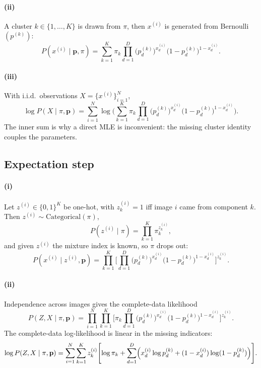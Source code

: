 \documentclass[11pt]{article}
\begin{document}
\paragraph{(ii)}
A cluster \(k\in\{1,\ldots,K\}\) is drawn from \(\pi\), then
\(x^{(i)}\) is generated from Bernoulli\((p^{(k)})\):
\begin{equation}
  P(x^{(i)}\mid \mathbf{p},\pi)
  =\sum_{k=1}^K \pi_k
  \prod_{d=1}^D
  \bigl(p_d^{(k)}\bigr)^{x_d^{(i)}}
  \bigl(1-p_d^{(k)}\bigr)^{1-x_d^{(i)}}.
\end{equation}

\paragraph{(iii)}
With i.i.d.\ observations \(X=\{x^{(i)}\}_{i=1}^N\),
\begin{equation}
  \log P(X\mid\pi,\mathbf{p})
  =\sum_{i=1}^N\log\Biggl(
    \sum_{k=1}^K \pi_k
    \prod_{d=1}^D
    \bigl(p_d^{(k)}\bigr)^{x_d^{(i)}}
    \bigl(1-p_d^{(k)}\bigr)^{1-x_d^{(i)}}
  \Biggr).
\end{equation}
The inner sum is why a direct MLE is inconvenient: the missing cluster
identity couples the parameters.

\subsection{Expectation step}

\paragraph{(i)}
Let \(z^{(i)}\in\{0,1\}^K\) be one-hot, with \(z_k^{(i)}=1\) iff image
\(i\) came from component \(k\). Then \(z^{(i)}\sim\mathrm{Categorical}(\pi)\),
\begin{equation}
  P(z^{(i)}\mid\pi)
  =\prod_{k=1}^K \pi_k^{z_k^{(i)}},
\end{equation}
and given \(z^{(i)}\) the mixture index is known, so \(\pi\) drops out:
\begin{equation}
  P(x^{(i)}\mid z^{(i)},\mathbf{p})
  =\prod_{k=1}^K
  \Biggl[
    \prod_{d=1}^D
    \bigl(p_d^{(k)}\bigr)^{x_d^{(i)}}
    \bigl(1-p_d^{(k)}\bigr)^{1-x_d^{(i)}}
  \Biggr]^{z_k^{(i)}}.
\end{equation}

\paragraph{(ii)}
Independence across images gives the complete-data likelihood
\begin{equation}
  P(Z,X\mid\pi,\mathbf{p})
  =\prod_{i=1}^N\prod_{k=1}^K
  \Biggl[
    \pi_k
    \prod_{d=1}^D
    \bigl(p_d^{(k)}\bigr)^{x_d^{(i)}}
    \bigl(1-p_d^{(k)}\bigr)^{1-x_d^{(i)}}
  \Biggr]^{z_k^{(i)}}.
\end{equation}
The complete-data log-likelihood is linear in the missing indicators:
\begin{equation}
  \log P(Z,X\mid\pi,\mathbf{p})
  =\sum_{i=1}^N\sum_{k=1}^K z_k^{(i)}
  \Biggl[
    \log\pi_k
    +\sum_{d=1}^D
    \Bigl(
      x_d^{(i)}\log p_d^{(k)}
      +(1-x_d^{(i)})\log(1-p_d^{(k)})
    \Bigr)
  \Biggr].
\end{equation}
\end{document}
